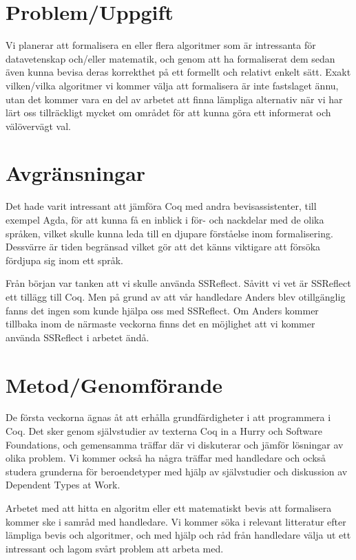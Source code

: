 \documentclass[a4paper]{article}
\begin{document}
\section*{Problem/Uppgift}

Vi planerar att formalisera en eller flera algoritmer som är intressanta för
datavetenskap och/eller matematik, och genom att ha formaliserat dem sedan även
kunna bevisa deras korrekthet på ett formellt och relativt enkelt sätt. Exakt
vilken/vilka algoritmer vi kommer välja att formalisera är inte fastslaget
ännu, utan det kommer vara en del av arbetet att finna lämpliga alternativ när
vi har lärt oss tillräckligt mycket om området för att kunna göra ett
informerat och välövervägt val.

\section*{Avgränsningar}

Det hade varit intressant att jämföra Coq med andra bevisassistenter, till
exempel Agda, för att kunna få en inblick i för- och nackdelar med de olika
språken, vilket skulle kunna leda till en djupare förståelse inom
formalisering. Dessvärre är tiden begränsad vilket gör att det känns viktigare
att försöka fördjupa sig inom ett språk.

Från början var tanken att vi skulle använda SSReflect. Såvitt vi vet är
SSReflect ett tillägg till Coq. Men på grund av att vår handledare Anders blev
otillgänglig fanns det ingen som kunde hjälpa oss med SSReflect. Om Anders
kommer tillbaka inom de närmaste veckorna finns det en möjlighet att vi kommer
använda SSReflect i arbetet ändå.

\section*{Metod/Genomförande}

De första veckorna ägnas åt att erhålla grundfärdigheter i att programmera i
Coq. Det sker genom självstudier av texterna Coq in a Hurry och Software
Foundations, och gemensamma träffar där vi diskuterar och jämför lösningar av
olika problem. Vi kommer också ha några träffar med handledare och också
studera grunderna för beroendetyper med hjälp av självstudier och diskussion av
Dependent Types at Work.

Arbetet med att hitta en algoritm eller ett matematiskt bevis att formalisera
kommer ske i samråd med handledare. Vi kommer söka i relevant litteratur efter
lämpliga bevis och algoritmer, och med hjälp och råd från handledare välja ut
ett intressant och lagom svårt problem att arbeta med.
\end{document}
